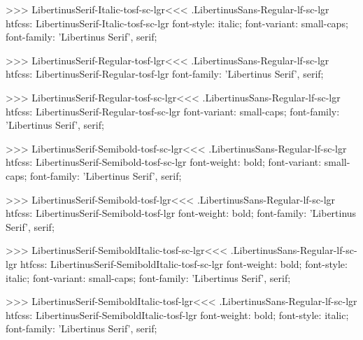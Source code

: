 >>>
\<LibertinusSerif-Italic-tosf-sc-lgr\><<<
.LibertinusSans-Regular-lf-sc-lgr
htfcss:  LibertinusSerif-Italic-tosf-sc-lgr  font-style: italic; font-variant: small-caps; font-family: 'Libertinus Serif', serif;

>>>
\<LibertinusSerif-Regular-tosf-lgr\><<<
.LibertinusSans-Regular-lf-sc-lgr
htfcss:  LibertinusSerif-Regular-tosf-lgr  font-family: 'Libertinus Serif', serif;

>>>
\<LibertinusSerif-Regular-tosf-sc-lgr\><<<
.LibertinusSans-Regular-lf-sc-lgr
htfcss:  LibertinusSerif-Regular-tosf-sc-lgr  font-variant: small-caps; font-family: 'Libertinus Serif', serif;

>>>
\<LibertinusSerif-Semibold-tosf-sc-lgr\><<<
.LibertinusSans-Regular-lf-sc-lgr
htfcss:  LibertinusSerif-Semibold-tosf-sc-lgr  font-weight: bold; font-variant: small-caps; font-family: 'Libertinus Serif', serif;

>>>
\<LibertinusSerif-Semibold-tosf-lgr\><<<
.LibertinusSans-Regular-lf-sc-lgr
htfcss:  LibertinusSerif-Semibold-tosf-lgr  font-weight: bold; font-family: 'Libertinus Serif', serif;

>>>
\<LibertinusSerif-SemiboldItalic-tosf-sc-lgr\><<<
.LibertinusSans-Regular-lf-sc-lgr
htfcss:  LibertinusSerif-SemiboldItalic-tosf-sc-lgr  font-weight: bold; font-style: italic; font-variant: small-caps; font-family: 'Libertinus Serif', serif;

>>>
\<LibertinusSerif-SemiboldItalic-tosf-lgr\><<<
.LibertinusSans-Regular-lf-sc-lgr
htfcss:  LibertinusSerif-SemiboldItalic-tosf-lgr  font-weight: bold; font-style: italic; font-family: 'Libertinus Serif', serif;

